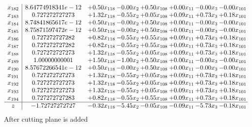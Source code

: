 \documentclass[8pt]{article}
\begin{document}
\[\begin{array}{c| c c@{\hskip 2pt} c@{\hskip 2pt} c@{\hskip 2pt} c@{\hskip 2pt} c@{\hskip 2pt} c@{\hskip 2pt} }
 x_{182}   &  8.64774918341e-12 & +  0.50 x_{118} & -0.00 x_{2} & +  0.50 x_{108} & +  0.00 x_{11} & -0.00 x_{3} & -0.00 x_{101}\\
 x_{183}   &  0.727272727273 & +  1.32 x_{118} & -0.55 x_{2} & +  0.05 x_{108} & +  0.09 x_{11} & +  0.73 x_{3} & +  0.18 x_{101}\\
 x_{184}   &  8.74841865617e-12 & +  0.50 x_{118} & -0.00 x_{2} & +  0.50 x_{108} & +  0.00 x_{11} & -0.00 x_{3} & -0.00 x_{101}\\
 x_{185}   &  8.75871597472e-12 & +  0.50 x_{118} & -0.00 x_{2} & +  0.50 x_{108} & +  0.00 x_{11} & -0.00 x_{3} & -0.00 x_{101}\\
 x_{186}   &  0.727272727282 & +  0.82 x_{118} & -0.55 x_{2} & +  0.55 x_{108} & +  0.09 x_{11} & +  0.73 x_{3} & +  0.18 x_{101}\\
 x_{187}   &  0.727272727282 & +  0.82 x_{118} & -0.55 x_{2} & +  0.55 x_{108} & +  0.09 x_{11} & +  0.73 x_{3} & +  0.18 x_{101}\\
 x_{188}   &  0.727272727273 & +  1.32 x_{118} & -0.55 x_{2} & +  0.05 x_{108} & +  0.09 x_{11} & +  0.73 x_{3} & +  0.18 x_{101}\\
 x_{189}   &  1.00000000001 & +  1.50 x_{118} & -1.00 x_{2} & +  0.50 x_{108} & +  0.00 x_{11} & -0.00 x_{3} & -0.00 x_{101}\\
 x_{190}   &  8.57672266541e-12 & +  0.50 x_{118} & -0.00 x_{2} & +  0.50 x_{108} & +  0.00 x_{11} & -0.00 x_{3} & -0.00 x_{101}\\
 x_{191}   &  0.727272727273 & +  1.32 x_{118} & -0.55 x_{2} & +  0.05 x_{108} & +  0.09 x_{11} & +  0.73 x_{3} & +  0.18 x_{101}\\
 x_{192}   &  0.727272727273 & +  1.32 x_{118} & -0.55 x_{2} & +  0.05 x_{108} & +  0.09 x_{11} & +  0.73 x_{3} & +  0.18 x_{101}\\
 x_{193}   &  0.727272727273 & +  1.32 x_{118} & -0.55 x_{2} & +  0.05 x_{108} & +  0.09 x_{11} & +  0.73 x_{3} & +  0.18 x_{101}\\
 x_{194}   &  0.727272727283 & +  0.82 x_{118} & -0.55 x_{2} & +  0.55 x_{108} & +  0.09 x_{11} & +  0.73 x_{3} & +  0.18 x_{101}\\
\hline
z    &  -1.72727272727 & -0.32 x_{118} & -5.45 x_{2} & -0.05 x_{108} & -0.09 x_{11} & -5.73 x_{3} & -0.18 x_{101}\\
\end{array}\]
 After cutting plane is added 
\end{document}
